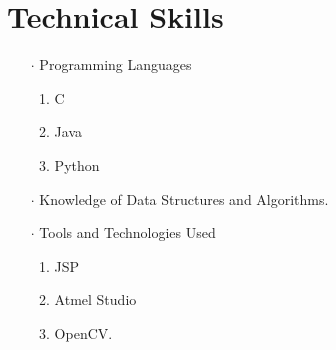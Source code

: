\documentclass[12pt]{article}
\begin{document}
\section*{Technical Skills}
\begin{itemize}
\item[$\cdot$]Programming Languages
\begin{enumerate}
\item C
\item Java
\item Python
\end{enumerate}
\item[$\cdot$]Knowledge of Data Structures and Algorithms.
\item[$\cdot$]Tools and Technologies Used
\begin{enumerate}
\item JSP
\item Atmel Studio
\item OpenCV.
\end{enumerate}
\end{itemize}
\end{document}
